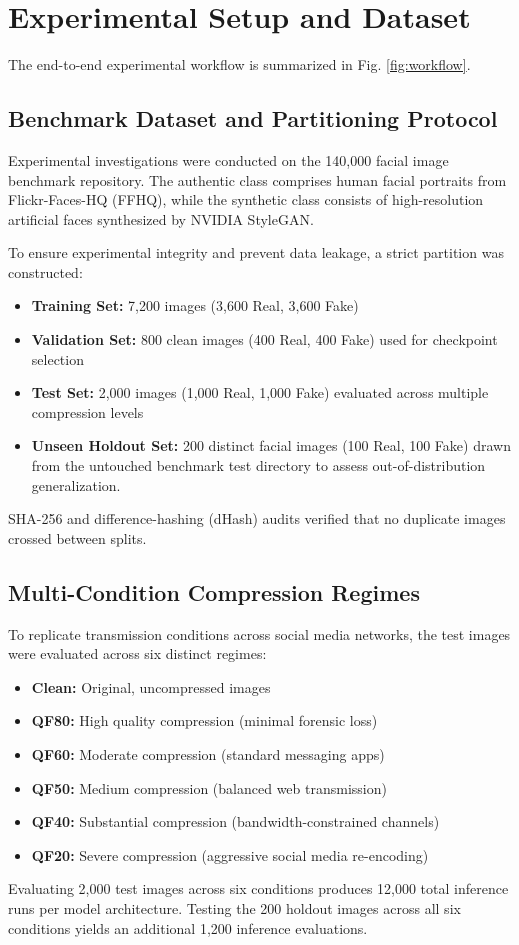 \documentclass[conference]{IEEEtran}
\begin{document}
\section{Experimental Setup and Dataset}

The end-to-end experimental workflow is summarized in Fig. \ref{fig:workflow}.

\subsection{Benchmark Dataset and Partitioning Protocol}
Experimental investigations were conducted on the 140,000 facial image benchmark repository. The authentic class comprises human facial portraits from Flickr-Faces-HQ (FFHQ), while the synthetic class consists of high-resolution artificial faces synthesized by NVIDIA StyleGAN.

To ensure experimental integrity and prevent data leakage, a strict partition was constructed:
\begin{itemize}
    \item \textbf{Training Set:} 7,200 images (3,600 Real, 3,600 Fake)
    \item \textbf{Validation Set:} 800 clean images (400 Real, 400 Fake) used for checkpoint selection
    \item \textbf{Test Set:} 2,000 images (1,000 Real, 1,000 Fake) evaluated across multiple compression levels
    \item \textbf{Unseen Holdout Set:} 200 distinct facial images (100 Real, 100 Fake) drawn from the untouched benchmark test directory to assess out-of-distribution generalization.
\end{itemize}
SHA-256 and difference-hashing (dHash) audits verified that no duplicate images crossed between splits.

\subsection{Multi-Condition Compression Regimes}
To replicate transmission conditions across social media networks, the test images were evaluated across six distinct regimes:
\begin{itemize}
    \item \textbf{Clean:} Original, uncompressed images
    \item \textbf{QF80:} High quality compression (minimal forensic loss)
    \item \textbf{QF60:} Moderate compression (standard messaging apps)
    \item \textbf{QF50:} Medium compression (balanced web transmission)
    \item \textbf{QF40:} Substantial compression (bandwidth-constrained channels)
    \item \textbf{QF20:} Severe compression (aggressive social media re-encoding)
\end{itemize}
Evaluating 2,000 test images across six conditions produces 12,000 total inference runs per model architecture. Testing the 200 holdout images across all six conditions yields an additional 1,200 inference evaluations.
\end{document}
